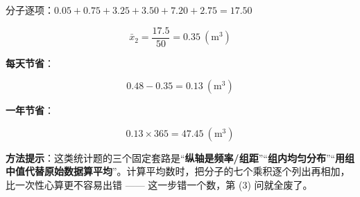 \begin{answer}
分子逐项：$0.05+0.75+3.25+3.50+7.20+2.75=17.50$

\nopagebreak[4]
\[\bar x_2=\frac{17.5}{50}=0.35\ \left(\mathrm m^{3}\right)\]

\textbf{每天节省}：

\nopagebreak[4]
\[0.48-0.35=0.13\ \left(\mathrm m^{3}\right)\]

\textbf{一年节省}：

\nopagebreak[4]
\[0.13\times365=47.45\ \left(\mathrm m^{3}\right)\]

\begin{gktip}
\textbf{方法提示}：这类统计题的三个固定套路是“\textbf{纵轴是频率/组距}”“\textbf{组内均匀分布}”“\textbf{用组中值代替原始数据算平均}”。计算平均数时，把分子的七个乘积逐个列出再相加，比一次性心算更不容易出错 —— 这一步错一个数，第 (3) 问就全废了。
\end{gktip}




\par\medskip

\end{answer}
